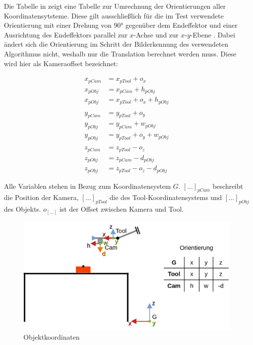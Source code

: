 Die Tabelle in  zeigt eine Tabelle zur Umrechnung der Orientierungen aller Koordinatensytsteme. Diese gilt ausschließlich für die im Test verwendete Orientierung mit einer Drehung von $90$° gegenüber dem Endeffektor und einer Ausrichtung des Endeffektors parallel zur $x$-Achse und zur $x$-$y$-Ebene . Dabei ändert sich die Orientierung im Schritt der Bilderkennung des verwendeten Algorithmus nicht, weshalb nur die Translation berechnet werden muss. Diese wird hier als Kameraoffset bezeichnet:

\begin{align*}
    x_{pCam} & = x_{pTool}+o_{x}\\
    x_{pObj} & = x_{pCam}+h_{pObj}\\
    x_{pObj} & = x_{pTool}+o_{x}+h_{pObj}\\\\
    y_{pCam} & = y_{pTool}+o_{y}\\
    y_{pObj} & = y_{pCam}+w_{pObj}\\
    y_{pObj} & = y_{pTool}+o_{y}+w_{pObj}\\\\
    z_{pCam} & = z_{pTool}-o_{z}\\
    z_{pObj} & = z_{pCam}-d_{pObj}\\
    z_{pObj} & = z_{pTool}-o_{z}-d_{pObj}
\end{align*}

Alle Variablen stehen in Bezug zum Koordinatensystem $G$. $[...]_{pCam}$ beschreibt die Position der Kamera, $[...]_{pTool}$ die des Tool-Koordinatensystems und $[...]_{pObj}$ des Objekts. $o_{[...]}$ ist der Offset zwischen Kamera und Tool. 

\begin{figure}[ht]
    \centering
    \includegraphics[width=\textwidth]{Bilder/realsense_transformation.jpg}
    \caption{Objektkoordinaten}
    \label{fig:realsense_transformation}
\end{figure}

